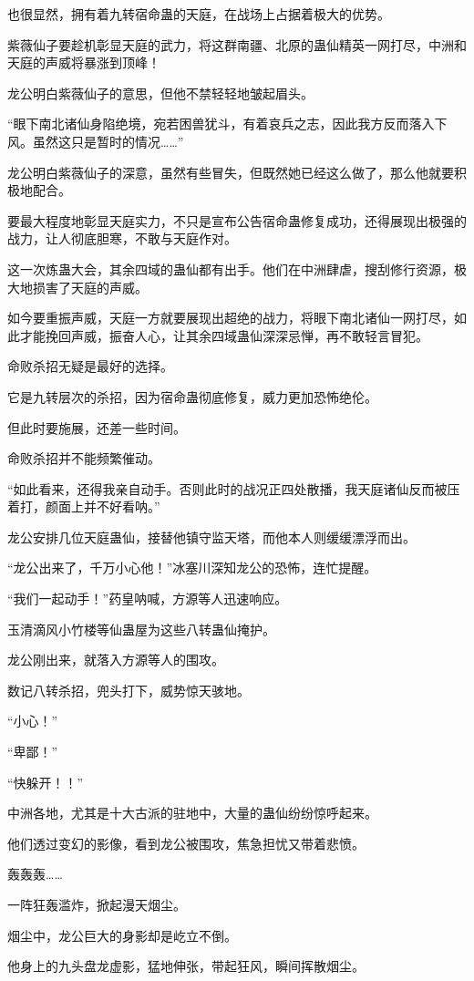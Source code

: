 \begin{this_body}
也很显然，拥有着九转宿命蛊的天庭，在战场上占据着极大的优势。

紫薇仙子要趁机彰显天庭的武力，将这群南疆、北原的蛊仙精英一网打尽，中洲和天庭的声威将暴涨到顶峰！

龙公明白紫薇仙子的意思，但他不禁轻轻地皱起眉头。

“眼下南北诸仙身陷绝境，宛若困兽犹斗，有着哀兵之志，因此我方反而落入下风。虽然这只是暂时的情况……”

龙公明白紫薇仙子的深意，虽然有些冒失，但既然她已经这么做了，那么他就要积极地配合。

要最大程度地彰显天庭实力，不只是宣布公告宿命蛊修复成功，还得展现出极强的战力，让人彻底胆寒，不敢与天庭作对。

这一次炼蛊大会，其余四域的蛊仙都有出手。他们在中洲肆虐，搜刮修行资源，极大地损害了天庭的声威。

如今要重振声威，天庭一方就要展现出超绝的战力，将眼下南北诸仙一网打尽，如此才能挽回声威，振奋人心，让其余四域蛊仙深深忌惮，再不敢轻言冒犯。

命败杀招无疑是最好的选择。

它是九转层次的杀招，因为宿命蛊彻底修复，威力更加恐怖绝伦。

但此时要施展，还差一些时间。

命败杀招并不能频繁催动。

“如此看来，还得我亲自动手。否则此时的战况正四处散播，我天庭诸仙反而被压着打，颜面上并不好看呐。”

龙公安排几位天庭蛊仙，接替他镇守监天塔，而他本人则缓缓漂浮而出。

“龙公出来了，千万小心他！”冰塞川深知龙公的恐怖，连忙提醒。

“我们一起动手！”药皇呐喊，方源等人迅速响应。

玉清滴风小竹楼等仙蛊屋为这些八转蛊仙掩护。

龙公刚出来，就落入方源等人的围攻。

数记八转杀招，兜头打下，威势惊天骇地。

“小心！”

“卑鄙！”

“快躲开！！”

中洲各地，尤其是十大古派的驻地中，大量的蛊仙纷纷惊呼起来。

他们透过变幻的影像，看到龙公被围攻，焦急担忧又带着悲愤。

轰轰轰……

一阵狂轰滥炸，掀起漫天烟尘。

烟尘中，龙公巨大的身影却是屹立不倒。

他身上的九头盘龙虚影，猛地伸张，带起狂风，瞬间挥散烟尘。


\end{this_body}
